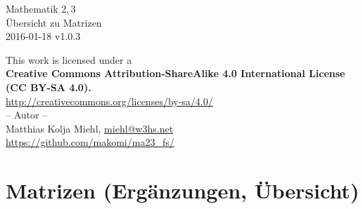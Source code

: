 \documentclass[a4paper,10pt,titlepage]{scrartcl}
\makeatletter
\newcommand{\projectURL}{https://github.com/makomi/ma23\_fs/}
\newcommand{\thisdocDATE}{2016-01-18 v1.0.3}
\newcommand{\myNAME}{Matthias Kolja Miehl}
\newcommand{\myEMAIL}{miehl@w3hs.net}
\makeatother
\begin{document}

\begin{titlepage}
  \vspace*{\fill}
  \begin{center}
    \huge
    Mathematik 2,\,3\\
    Übersicht zu Matrizen\\
    \vspace{1.5cm}
    \large
    \thisdocDATE
  \end{center}
  \vspace*{\fill}
  \begin{center}{\fontsize{9pt}{11pt}\selectfont
    This work is licensed under a\\[1em]
    \textbf{Creative Commons Attribution-ShareAlike 4.0 International License (CC BY-SA 4.0).\\[1em]}
    \url{http://creativecommons.org/licenses/by-sa/4.0/}\\
  }
  \vspace*{\fill}
%
  -- Autor -- \medskip\\
  \myNAME, \href{mailto:\myEMAIL}{\myEMAIL}\smallskip\\
  \url{\projectURL}
  \vspace*{1cm}
  \end{center}
\end{titlepage}

\newpage

\setcounter{page}{1}


\section*{Matrizen (Ergänzungen, Übersicht)}
\label{sec:matrizen}
\end{document}
